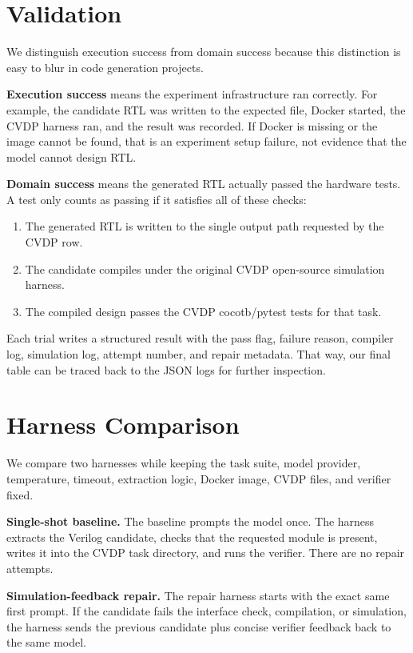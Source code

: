 \documentclass{article}
\begin{document}
\section{Validation}

We distinguish execution success from domain success because this distinction is easy to blur in code generation projects.

\textbf{Execution success} means the experiment infrastructure ran correctly. For example, the candidate RTL was written to the expected file, Docker started, the CVDP harness ran, and the result was recorded. If Docker is missing or the image cannot be found, that is an experiment setup failure, not evidence that the model cannot design RTL.

\textbf{Domain success} means the generated RTL actually passed the hardware tests. A test only counts as passing if it satisfies all of these checks:

\begin{enumerate}
    \item The generated RTL is written to the single output path requested by the CVDP row.
    \item The candidate compiles under the original CVDP open-source simulation harness.
    \item The compiled design passes the CVDP cocotb/pytest tests for that task.
\end{enumerate}

Each trial writes a structured result with the pass flag, failure reason, compiler log, simulation log, attempt number, and repair metadata. That way, our final table can be traced back to the JSON logs for further inspection.

\section{Harness Comparison}

We compare two harnesses while keeping the task suite, model provider, temperature, timeout, extraction logic, Docker image, CVDP files, and verifier fixed.

\textbf{Single-shot baseline.} The baseline prompts the model once. The harness extracts the Verilog candidate, checks that the requested module is present, writes it into the CVDP task directory, and runs the verifier. There are no repair attempts.

\textbf{Simulation-feedback repair.} The repair harness starts with the exact same first prompt. If the candidate fails the interface check, compilation, or simulation, the harness sends the previous candidate plus concise verifier feedback back to the same model.
\end{document}
